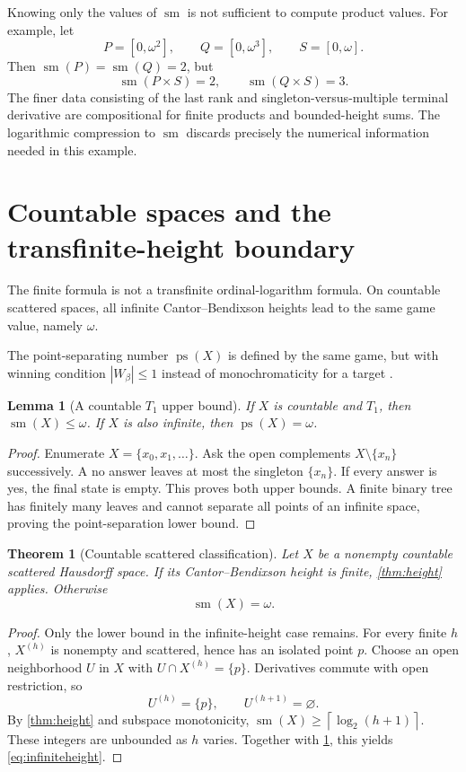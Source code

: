 \documentclass[11pt,letterpaper]{article}
\numberwithin{equation}{section}
\newtheorem{theorem}{Theorem}[section]
\newtheorem{lemma}[lemma]{Lemma}
\theoremstyle{definition}
\theoremstyle{remark}
\theoremstyle{definition}
\newcommand{\sm}{\operatorname{sm}}
\newcommand{\ps}{\operatorname{ps}}
\newcommand{\ceil}[1]{\left\lceil#1\right\rceil}
\begin{document}
Knowing only the values of $\sm$ is not sufficient to compute product values.
For example, let
\[
 P=[0,\omega^2],\qquad Q=[0,\omega^3],\qquad S=[0,\omega].
\]
Then $\sm(P)=\sm(Q)=2$, but
\[
 \sm(P\times S)=2,\qquad \sm(Q\times S)=3.
\]
The finer data consisting of the last rank and singleton-versus-multiple
terminal derivative are compositional for finite products and bounded-height
sums. The logarithmic compression to $\sm$ discards precisely the numerical
information needed in this example.

\section{Countable spaces and the transfinite-height boundary}
\label{sec:countable}

The finite formula is not a transfinite ordinal-logarithm formula. On countable
scattered spaces, all infinite Cantor--Bendixson heights lead to the same game
value, namely $\omega$.

The point-separating number $\ps(X)$ is defined by the same game, but with
winning condition $|W_\beta|\leq1$ instead of monochromaticity for a target
\cite{CCS}.

\begin{lemma}[A countable $T_1$ upper bound]\label{lem:countable}
If $X$ is countable and $T_1$, then $\sm(X)\leq\omega$. If $X$ is also infinite,
then $\ps(X)=\omega$.
\end{lemma}
\begin{proof}
Enumerate $X=\{x_0,x_1,\ldots\}$. Ask the open complements
$X\setminus\{x_n\}$ successively. A no answer leaves at most the singleton
$\{x_n\}$. If every answer is yes, the final state is empty. This proves both
upper bounds. A finite binary tree has finitely many leaves and cannot separate
all points of an infinite space, proving the point-separation lower bound.
\end{proof}

\begin{theorem}[Countable scattered classification]\label{thm:countable}
Let $X$ be a nonempty countable scattered Hausdorff space. If its
Cantor--Bendixson height is finite, \cref{thm:height} applies. Otherwise
\begin{equation}\label{eq:infiniteheight}
 \sm(X)=\omega.
\end{equation}
\end{theorem}
\begin{proof}
Only the lower bound in the infinite-height case remains. For every finite $h$,
$X^{(h)}$ is nonempty and scattered, hence has an isolated point $p$.
Choose an open neighborhood $U$ in $X$ with $U\cap X^{(h)}=\{p\}$.
Derivatives commute with open restriction, so
\[
 U^{(h)}=\{p\},\qquad U^{(h+1)}=\varnothing.
\]
By \cref{thm:height} and subspace monotonicity,
$\sm(X)\geq\ceil{\log_2(h+1)}$. These integers are unbounded as $h$ varies.
Together with \cref{lem:countable}, this yields \eqref{eq:infiniteheight}.
\end{proof}
\end{document}
